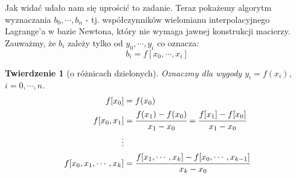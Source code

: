 \documentclass[hidelinks,a4paper,fleqn,oneside]{book}
\newtheorem{twierdz}{Twierdzenie}
\begin{document}
Jak widać udało nam się uprościć to zadanie. Teraz pokażemy algorytm wyznaczania $b_0, \cdots, b_n$ - tj. współczynników wielomianu interpolacyjnego Lagrange'a w bazie Newtona, który nie wymaga jawnej konstrukcji macierzy. Zauważmy, że $b_i$ zależy tylko od $y_0, \cdots, y_i$ co oznacza:
\[
	b_i = f[x_0, \cdots, x_i]
\]
\begin{twierdz}[o różnicach dzielonych]
Oznaczmy dla wygody $y_i = f(x_i)$, $i = 0, \cdots, n$.
	\begin{align*}
		f[x_0] & = f(x_0) \\
		f[x_0, x_1] & = \cfrac{f(x_1) - f(x_0)}{x_1 - x_0} = \cfrac{f[x_1] - f[x_0]}{x_1 - x_0} \\
		\vdots & \\
		f[x_0, x_1, \cdots, x_k] & = \cfrac{f[x_1, \cdots, x_k] - f[x_0, \cdots, x_{k-1}]}{x_k - x_0}
	\end{align*}
\end{twierdz}
\end{document}
